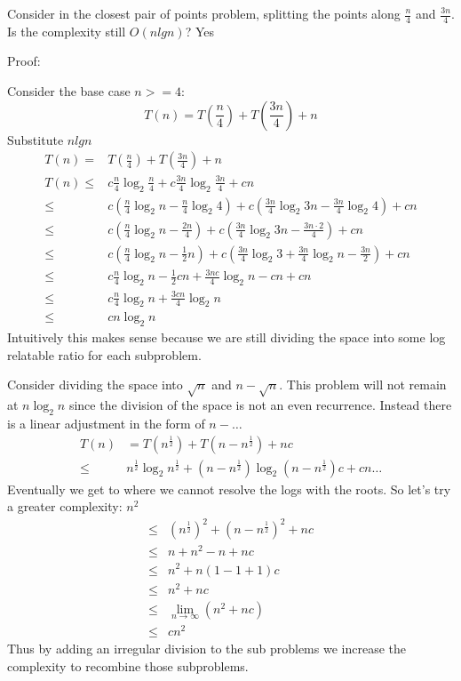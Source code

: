\documentclass[12pt]{article}
\newenvironment{problem}[2][Problem]{\begin{trivlist}
\item[\hskip \labelsep {\bfseries #1}\hskip \labelsep {\bfseries #2.}]}{\end{trivlist}}
\begin{document}
\begin{problem}{2}
Consider in the closest pair of points problem, splitting the points along
$ \frac{n}{4}$ and $\frac{3n}{4}$. Is the complexity still $O(n lg n)$? Yes

Proof:

Consider the base case $ n >= 4$:
\begin{equation*}
    T(n) = T(\frac{n}{4}) + T(\frac{3n}{4}) + n
\end{equation*}
Substitute $n lg n$
\begin{align*}
    T(n) =& T(\frac{n}{4}) + T(\frac{3n}{4}) + n\\
    T(n) \le& c \frac{n}{4} \log_2{\frac{n}{4}}    + c \frac{3n}{4}\log_2{\frac{3n}{4}} + cn\\
    \le& c \left( \frac{n}{4} \log_2{n} - \frac{n}{4} \log_2{4} \right)
    + c \left(\frac{3n}{4} \log_2{3n} - \frac{3n}{4} \log_2{4} \right) + cn \\
    \le& c \left( \frac{n}{4} \log_2{n} - \frac{2n}{4} \right)  + c \left( \frac{3n}{4} \log_2{3n} - \frac{3n\cdot2}{4} \right) + cn \\
    \le& c\left(\frac{n}{4} \log_2{n} - \frac{1}{2}n\right)   + c \left(\frac{3n}{4} \log_2{3} + \frac{3n}{4} \log_2{n} - \frac{3n}{2}\right) + cn\\
    \le& c\frac{n}{4} \log_2{n} - \frac{1}{2}cn + \frac{3nc}{4} \log_2{n} - cn
    + cn\\
    \le& c\frac{n}{4} \log_2{n} + \frac{3cn}{4}\log_2{n} \\
    \le& cn\log_2{n}
\end{align*}
Intuitively this makes sense because we are still dividing the space into some
log relatable ratio for each subproblem. 

Consider dividing the space into $\sqrt{n}$ and $n-\sqrt{n}$. This problem will
not remain at $n \log_2{n}$ since the division of the space is not an even
recurrence. Instead there is a linear adjustment in the form of $n - \dots$
\begin{align*}
    T(n) &= T(n^{\frac{1}{2}}) + T(n-n^{\frac{1}{2}}) + nc\\
    \le& n^{\frac{1}{2}} \log_2{n^{\frac{1}{2}}} + \left(n-
    n^{\frac{1}{2}}\right) \log_2\left(n - n^{\frac{1}{2}}\right) c + cn
    \dots
\end{align*}
Eventually we get to where we cannot resolve the logs with the roots.  So let's
try a greater complexity: $n^2$
\begin{align*}
    \le& \left( n^{\frac{1}{2}} \right)^2 + \left( n - n^\frac{1}{2} \right)^2
    + nc\\
    \le& n + n^2 - n + nc\\
    \le& n^2 + n(1 - 1 + 1)c\\
    \le& n^2 + nc\\
    \le& \lim_{n\to \infty}\left(n^2 + nc\right)\\
    \le& cn^2
\end{align*}
Thus by adding an irregular division to the sub problems we increase the
complexity to recombine those subproblems.
\end{problem}
\end{document}
